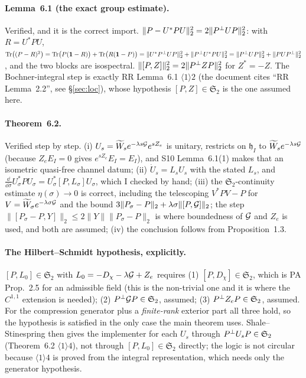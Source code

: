 \documentclass[11pt]{article}
\newcommand{\Wt}{\widetilde W}\newcommand{\Om}{\Omega}\newcommand{\Gm}{\Gamma}
\newcommand{\Stwo}{\mathfrak S_2}\newcommand{\Sone}{\mathfrak S_1}
\newcommand{\norm}[1]{\lVert #1\rVert}\newcommand{\abs}[1]{\lvert #1\rvert}
\begin{document}
\paragraph{Lemma~6.1 (the exact group estimate).}  Verified, and it is the correct import.
$\norm{P-U^*PU}_2^2=2\norm{\Pperp UP}_2^2$: with $R=U^*PU$,
$\Tr\bigl((P-R)^2\bigr)=\Tr\bigl(P(\one-R)\bigr)+\Tr\bigl(R(\one-P)\bigr)
=\norm{U^*\Pperp UP}_2^2+\norm{\Pperp U^*PU}_2^2=\norm{\Pperp UP}_2^2+\norm{PU\Pperp}_2^2$,
and the two blocks are isospectral.  $\norm{[P,Z]}_2^2=2\norm{\Pperp ZP}_2^2$ for
$Z^*=-Z$.  The Bochner-integral step is exactly RR Lemma~6.1 $\langle1\rangle2$ (the
document cites ``RR Lemma~2.2'', see \S\ref{sec:loc}), whose hypothesis
$[P,Z]\in\Stwo$ is the one assumed here.

\paragraph{Theorem~6.2.}  Verified step by step.  (i) $U_s=\Wt_se^{-\lambda s\Gs}e^{sZ_e}$ is
unitary, restricts on $\mathfrak h_I$ to $\Wt_se^{-\lambda s\Gs}$ (because $Z_eE_I=0$ gives
$e^{sZ_e}E_I=E_I$), and S10 Lemma~6.1(1) makes that an isometric quasi-free channel datum;
(ii) $\dot U_s=L_sU_s$ with the stated $L_s$, and
$\frac{\dd}{\dd\sigma}U_\sigma^*PU_\sigma=U_\sigma^*[P,L_\sigma]U_\sigma$, which I checked by
hand; (iii) the $\Stwo$-continuity estimate $\eta(\sigma)\to0$ is correct, including the
telescoping $V^*PV-P$ for $V=\Wt_\sigma e^{-\lambda\sigma\Gs}$ and the bound
$3\norm{P_\sigma-P}_2+\lambda\sigma\norm{[P,\Gs]}_2$; the step
$\norm{[P_\sigma-P,Y]}_2\le2\norm Y\norm{P_\sigma-P}_2$ is where boundedness of $\mathcal G$ and
$Z_e$ is used, and both are assumed; (iv) the conclusion follows from Proposition~1.3.

\paragraph{The Hilbert--Schmidt hypothesis, explicitly.}  $[P,L_0]\in\Stwo$ with
$L_0=-D_\chi-\lambda\mathcal G+Z_e$ requires (1) $[P,D_\chi]\in\Stwo$, which is PA Prop.~2.5 for an
admissible field (this is the non-trivial one and it is where the $C^{1,1}$ extension is
needed); (2) $\Pperp\Gs P\in\Stwo$, assumed; (3) $\Pperp Z_eP\in\Stwo$, assumed.  For the
compression generator plus a \emph{finite-rank} exterior part all three hold, so the
hypothesis is satisfied in the only case the main theorem uses.  Shale--Stinespring then
gives the implementer for each $U_s$ through $\Pperp U_sP\in\Stwo$ (Theorem~6.2
$\langle1\rangle4$), not through $[P,L_0]\in\Stwo$ directly; the logic is not circular
because $\langle1\rangle4$ is proved from the integral representation, which needs only the
generator hypothesis.
\end{document}

